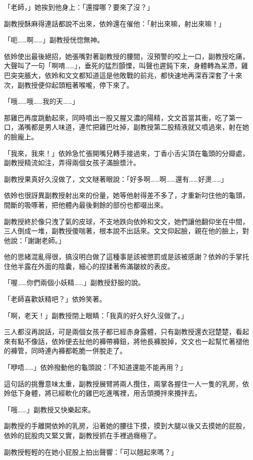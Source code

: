 「老師，」她挨到他身上：「還撐哪？要來了沒？」

副教授酥麻得連話都說不出來，依姈還在催他：「射出來嘛，射出來嘛！」

「呃……啊……」副教授恍惚無神。

依姈使出最後絕招，她張嘴對著副教授的腰間，沒預警的咬上一口，副教授吃痛，大聲叫了一句「啊唷……」，垂死的猛烈顫慄，叫聲也遲鈍下來，身體轉為呆滯，雞巴突突脹大，依姈和文文都知道這是他敗戰的前兆，都快速地再深吞深套了十來次，副教授便仰起頭粗著喉嚨，停下來了。

「哦……哦……我的天……」

那雞巴再度跳動起來，同時噴出一股又腥又濃的陽精，文文首當其衝，吃了第一口，滿嘴都是男人味道，連忙把雞巴吐掉，副教授第二股精液就又噴過來，射在她的臉龐上。

「我來，我來！」依姈急忙張開嘴兒轉手接過來，丁香小舌尖頂在龜頭的分瓣處，副教授精流如注，弄得兩個女孩子滿臉漿汁。

副教授果真好久沒做了，文文瞇著眼說：「好多啊……啊……還有……好燙……」

依姈也很訝異副教授射出來的份量，她等他射得差不多了，才重新叼住他的龜頭，間斷的吸啄著，把他體內最後剩餘的部份也都啜出來。

副教授終於像只洩了氣的皮球，不支地跌向依姈和文文，她們讓他翻仰坐在中間，三人倒成一堆，副教授傻喘著，根本說不出話來。文文仰起臉，親在他的臉上，對他說：「謝謝老師。」

他的思緒混亂得很，搞沒明白做了這種事是該被懲罰或是該被感謝？依姈的手掌托住他半露在外面的陰囊，細心的捏揉著佈滿皺紋的表皮。

「喔……你們兩個小妖精……」副教授舒服的說。

「老師喜歡妖精吧？」依姈笑著。

「啊，老天！」副教授閉上眼睛：「我真的好久好久沒做了。」

三人都沒再說話，可是兩個女孩子都已經赤身露體，只有副教授還衣冠楚楚，看起來有點不像話，依姈便去扯他的褲帶褲鈕，將他長褲脫掉，文文也一起幫忙著褪他的褲管，同時連內褲都乾脆一併脫走了。

「咿唔……」依姈撥動他的龜頭說：「不知道還能不能再用？」

這句話的挑釁意味太重，副教授展臂將兩人攬住，兩掌各握住一人一隻的乳房，依姈低下身體，將已經軟化的雞巴吃進嘴裡，用舌頭攪拌來攪拌去。

「哦……」副教授又快樂起來。

副教授的手離開依姈的乳房，沿著她的腰往下摸，摸到大腿以後又去摸她的屁股，依姈的屁股肉又緊又實，副教授抓在手裡過癮極了。

副教授輕輕的在她小屁股上拍出聲響：「可以翹起來嗎？」

